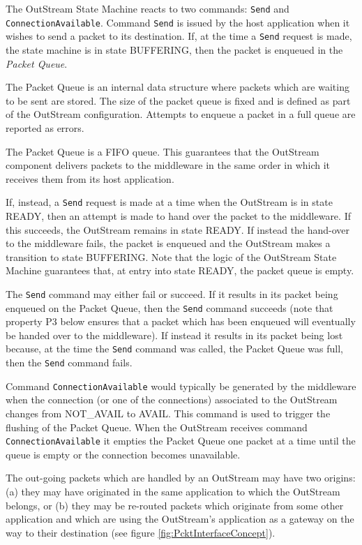 The OutStream State Machine reacts to two commands: \texttt{Send} and \texttt{ConnectionAvailable}. Command \texttt{Send} is issued by the host application when it wishes to send a packet to its destination. If, at the time a \texttt{Send} request is made, the state machine is in state BUFFERING, then the packet is enqueued in the \textit{Packet Queue}. 

The Packet Queue is an internal data structure where packets which are waiting to be sent are stored. The size of the packet queue is fixed and is defined as part of the OutStream configuration. Attempts to enqueue a packet in a full queue are reported as errors.

The Packet Queue is a FIFO queue. This guarantees that the OutStream component delivers packets to the middleware in the same order in which it receives them from its host application. 

If, instead, a \texttt{Send} request is made at a time when the OutStream is in state READY, then an attempt is made to hand over the packet to the middleware. If this succeeds, the OutStream remains in state READY. If instead the hand-over to the middleware fails, the packet is enqueued and the OutStream makes a transition to state BUFFERING. Note that the logic of the OutStream State Machine guarantees that, at entry into state READY, the packet queue is empty.
 
The \texttt{Send} command may either fail or succeed. If it results in its packet being enqueued on the Packet Queue, then the \texttt{Send} command succeeds (note that property P3 below ensures that a packet which has been enqueued will eventually be handed over to the middleware). If instead it results in its packet being lost because, at the time the \texttt{Send} command was called, the Packet Queue was full, then the \texttt{Send} command fails. 

Command \texttt{ConnectionAvailable} would typically be generated by the middleware when the connection (or one of the connections) associated to the OutStream changes from NOT\_AVAIL to AVAIL. This command is used to trigger the flushing of the Packet Queue. When the OutStream receives command \texttt{ConnectionAvailable} it empties the Packet Queue one packet at a time until the queue is empty or the connection becomes unavailable.

The out-going packets which are handled by an OutStream may have two origins: (a) they may have originated in the same application to which the OutStream belongs, or (b) they may be re-routed packets which originate from some other application and which are using the OutStream's application as a gateway on the way to their destination (see figure \ref{fig:PcktInterfaceConcept}). 

